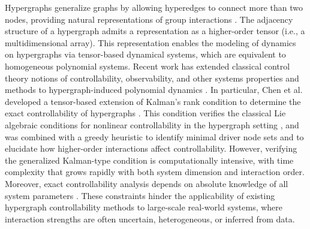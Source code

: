 \documentclass[journal,twoside,web]{ieeecolor}
\begin{document}
Hypergraphs generalize graphs by allowing hyperedges to connect more than two nodes, providing natural representations of group interactions \cite{berge1984hypergraphs}.
%
The adjacency structure of a hypergraph admits a representation as a higher-order tensor (i.e., a multidimensional array).
%
This representation enables the modeling of dynamics on hypergraphs via tensor-based dynamical systems, which are equivalent to homogeneous polynomial  systems.
%
Recent work has extended classical control theory notions of controllability, observability, and other systems properties and methods to hypergraph-induced polynomial dynamics \cite{chen2021controllability,pickard2023observability, pickard2023kronecker, pickard2024geometric, pickard2025scalable,dong2024controllability,chen2022explicit,10910206,11124400,cui2024discrete,zhang2024global,mao2026model,11240158}.
%
In particular, Chen et al. developed a tensor-based extension of Kalman’s rank condition to determine the exact controllability of hypergraphs \cite{chen2021controllability}.
%
This condition verifies the classical Lie algebraic conditions for nonlinear controllability in the hypergraph setting \cite{hermann1977nonlinear, jurdjevic1983polynomial, jurdjevic1985polynomial}, and was combined with a greedy heuristic to identify minimal driver node sets and to elucidate how higher-order interactions affect controllability.
%
However, verifying the generalized Kalman-type condition is computationally intensive, with time complexity that grows rapidly with both  system dimension and  interaction order.
%
Moreover, exact controllability analysis depends on absolute knowledge of all system parameters \cite{lee1967foundations}.
%
These constraints  hinder the applicability of existing hypergraph controllability methods to large-scale real-world systems, where interaction strengths are often uncertain, heterogeneous, or inferred from data.
\end{document}
